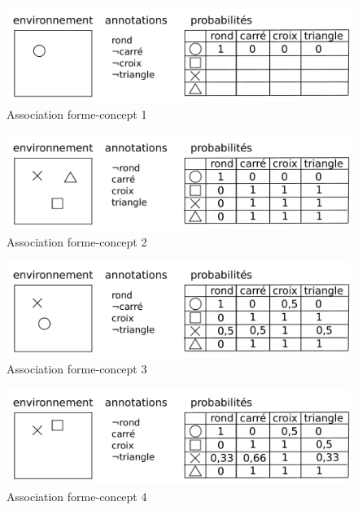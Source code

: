 \begin{figure}[H] 
\includegraphics[width=\textwidth]{files/raisonneur/annotations_1} 
\caption{Association forme-concept 1} 
\label{img_annotations_1}
\end{figure}

\begin{figure}[H] 
\includegraphics[width=\textwidth]{files/raisonneur/annotations_2} 
\caption{Association forme-concept 2} 
\label{img_annotations_2}
\end{figure}

\begin{figure}[H] 
\includegraphics[width=\textwidth]{files/raisonneur/annotations_3} 
\caption{Association forme-concept 3} 
\label{img_annotations_3}
\end{figure}

\begin{figure}[H] 
\includegraphics[width=\textwidth]{files/raisonneur/annotations_4} 
\caption{Association forme-concept 4} 
\label{img_annotations_4}
\end{figure}

